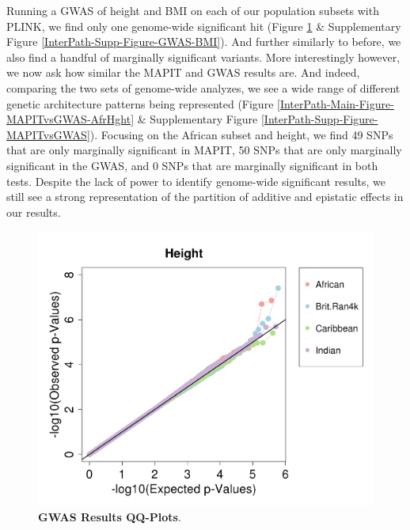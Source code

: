 \documentclass[12pt, a4paper]{article}
\begin{document}
Running a GWAS of height and BMI on each of our population subsets with PLINK, we find only one genome-wide significant hit (Figure \ref{InterPath-Main-Figure-GWAS-Height} \& Supplementary Figure \ref{InterPath-Supp-Figure-GWAS-BMI}). And further similarly to before, we also find a handful of marginally significant variants. More interestingly however, we now ask how similar the MAPIT and GWAS results are. And indeed, comparing the two sets of genome-wide analyzes, we see a wide range of different genetic architecture patterns being represented (Figure \ref{InterPath-Main-Figure-MAPITvsGWAS-AfrHght} \& Supplementary Figure \ref{InterPath-Supp-Figure-MAPITvsGWAS}). Focusing on the African subset and height, we find 49 SNPs that are only marginally significant in MAPIT, 50 SNPs that are only marginally significant in the GWAS, and 0 SNPs that are marginally significant in both tests. Despite the lack of power to identify genome-wide significant results, we still see a strong representation of the partition of additive and epistatic effects in our results. 

\begin{figure}[htbp]
\centering
\includegraphics[scale=.35]{Images/Main/InterPath_Main_Figure_GWAS_vs2_Height.png}
\caption[TBD]{\textbf{GWAS Results QQ-Plots}.}
\label{InterPath-Main-Figure-GWAS-Height}
\end{figure}
\end{document}
